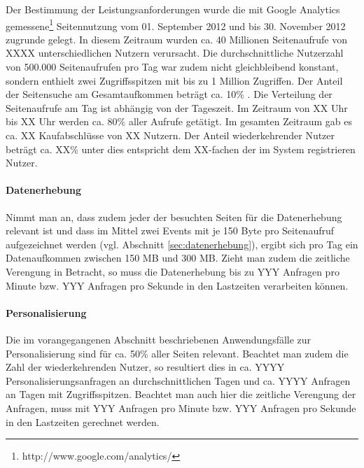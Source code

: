 Der Bestimmung der Leistungsanforderungen wurde die mit Google Analytics gemessene\footnote{http://www.google.com/analytics/} Seitennutzung vom 01. September 2012 und bis 30. November 2012 zugrunde gelegt. In diesem Zeitraum wurden ca. 40 Millionen Seitenaufrufe von XXXX  unterschiedlichen Nutzern verursacht. Die durchschnittliche Nutzerzahl von 500.000 Seitenaufrufen pro Tag war zudem nicht gleichbleibend konstant, sondern enthielt zwei Zugriffsspitzen mit bis zu 1 Million Zugriffen. Der Anteil der Seitensuche am Gesamtaufkommen beträgt ca. 10\% . Die Verteilung der Seitenaufrufe am Tag ist abhängig von der Tageszeit. Im Zeitraum von XX Uhr bis XX Uhr   werden ca. 80\% aller Aufrufe getätigt. Im gesamten Zeitraum gab es ca. XX Kaufabschlüsse von XX   Nutzern. Der Anteil wiederkehrender Nutzer beträgt ca.  XX\% unter dies entspricht dem XX-fachen der im System registrieren Nutzer. 

\paragraph{Datenerhebung} Nimmt man an, dass zudem jeder der besuchten Seiten für die Datenerhebung relevant ist und dass im Mittel zwei Events mit je 150 Byte pro Seitenaufruf aufgezeichnet werden (vgl. Abschnitt \ref{sec:datenerhebung}), ergibt sich pro Tag ein Datenaufkommen zwischen 150 MB und 300 MB. Zieht man zudem die zeitliche Verengung in Betracht, so muss die Datenerhebung bis zu YYY Anfragen pro Minute bzw. YYY Anfragen pro Sekunde  in den Lastzeiten verarbeiten können.

\paragraph{Personalisierung} Die im vorangegangenen Abschnitt beschriebenen Anwendungsfälle zur Personalisierung sind für ca. 50\% aller Seiten relevant. Beachtet man zudem die Zahl der wiederkehrenden Nutzer, so resultiert dies in ca. YYYY  Personalisierungsanfragen an durchschnittlichen Tagen und ca. YYYY  Anfragen an Tagen mit Zugriffsspitzen. Beachtet man auch hier die zeitliche Verengung der Anfragen, muss mit YYY Anfragen pro Minute bzw. YYY Anfragen pro Sekunde  in den Lastzeiten gerechnet werden.


